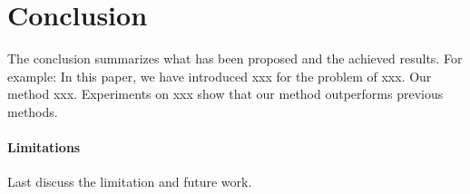 \section{Conclusion}%
\label{sec:Conclusion}
The conclusion summarizes what has been proposed and the achieved results. For example: In this paper, we have introduced xxx for the problem of xxx. Our method xxx. Experiments on xxx show that our method outperforms previous methods.

\paragraph{Limitations} Last discuss the limitation and future work.


